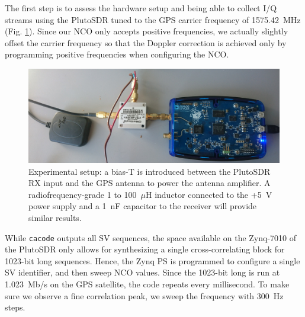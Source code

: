 \documentclass{article}
\begin{document}
The first step is to assess the hardware setup and being able to collect I/Q streams using the 
PlutoSDR tuned to the GPS carrier frequency of 1575.42~MHz (Fig. \ref{f4}). Since our NCO only accepts positive
frequencies, we actually slightly offset the carrier frequency so that the Doppler correction is
achieved only by programming positive frequencies when configuring the NCO.

\begin{figure}[h!tb]
\includegraphics[width=\linewidth]{DSC_0279.JPG}
\caption{Experimental setup: a bias-T is introduced between the PlutoSDR RX input and the
GPS antenna to power the antenna amplifier. A radiofrequency-grade 1 to 100~$\mu$H inductor
connected to the +5~V power supply and a 1~nF capacitor to the receiver will provide similar 
results.} 
\label{f4}
\end{figure}

While {\tt cacode} outputs all SV sequences, the space available on the Zynq-7010 of the PlutoSDR only
allows for synthesizing a single cross-correlating block for 1023-bit long sequences. Hence, the
Zynq PS is programmed to configure a single SV identifier, and then sweep NCO values. Since the 
1023-bit long is run at 1.023~Mb/s on the GPS satellite, the code repeats every millisecond. To make
sure we observe a fine correlation peak, we sweep the frequency with 300~Hz steps.
\end{document}
